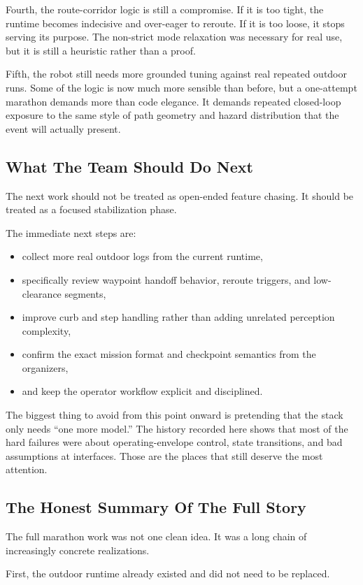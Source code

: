 \documentclass[11pt]{article}
\begin{document}
Fourth, the route-corridor logic is still a compromise. If it is too tight, the runtime becomes indecisive and over-eager to reroute. If it is too loose, it stops serving its purpose. The non-strict mode relaxation was necessary for real use, but it is still a heuristic rather than a proof.

Fifth, the robot still needs more grounded tuning against real repeated outdoor runs. Some of the logic is now much more sensible than before, but a one-attempt marathon demands more than code elegance. It demands repeated closed-loop exposure to the same style of path geometry and hazard distribution that the event will actually present.

\subsection{What The Team Should Do Next}
The next work should not be treated as open-ended feature chasing. It should be treated as a focused stabilization phase.

The immediate next steps are:
\begin{itemize}[leftmargin=*]
\item collect more real outdoor logs from the current runtime,
\item specifically review waypoint handoff behavior, reroute triggers, and low-clearance segments,
\item improve curb and step handling rather than adding unrelated perception complexity,
\item confirm the exact mission format and checkpoint semantics from the organizers,
\item and keep the operator workflow explicit and disciplined.
\end{itemize}

The biggest thing to avoid from this point onward is pretending that the stack only needs ``one more model.'' The history recorded here shows that most of the hard failures were about operating-envelope control, state transitions, and bad assumptions at interfaces. Those are the places that still deserve the most attention.

\subsection{The Honest Summary Of The Full Story}
The full marathon work was not one clean idea. It was a long chain of increasingly concrete realizations.

First, the outdoor runtime already existed and did not need to be replaced.
\end{document}
